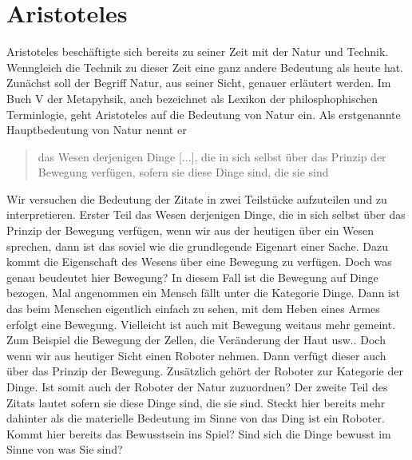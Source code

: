 \section{Aristoteles}
Aristoteles beschäftigte sich bereits zu seiner Zeit mit der Natur und Technik. Wenngleich die Technik zu dieser Zeit eine ganz andere Bedeutung als heute hat. Zunächst soll der Begriff Natur, aus seiner Sicht, genauer erläutert werden. Im Buch V der Metapyhsik, auch bezeichnet als \glqq Lexikon der philosphophischen Terminlogie\grqq{}, geht Aristoteles auf die Bedeutung von Natur ein. Als erstgenannte Hauptbedeutung von Natur nennt er
\begin{quote}
	\glqq das Wesen derjenigen Dinge [...], die in sich selbst über das Prinzip der Bewegung verfügen, sofern sie diese Dinge sind, die sie sind\grqq{}
	\cite[1015a14 f.]{MetaphysikV} 
\end{quote}


Wir versuchen die Bedeutung der Zitate in zwei Teilstücke aufzuteilen und zu interpretieren. Erster Teil \glqq das Wesen derjenigen Dinge, die in sich selbst über das Prinzip der Bewegung verfügen\grqq{}, wenn wir aus der heutigen über ein Wesen sprechen, dann ist das soviel wie die grundlegende Eigenart einer Sache. Dazu kommt die Eigenschaft des Wesens über eine Bewegung zu verfügen. Doch was genau beudeutet hier Bewegung? In diesem Fall ist die Bewegung auf Dinge bezogen. Mal angenommen ein Mensch fällt unter die Kategorie Dinge. Dann ist das beim Menschen eigentlich einfach zu sehen, mit dem Heben eines Armes erfolgt eine Bewegung. Vielleicht ist auch mit Bewegung weitaus mehr gemeint. Zum Beispiel die Bewegung der Zellen, die Veränderung der Haut usw.. Doch wenn wir aus heutiger Sicht einen Roboter nehmen. Dann verfügt dieser auch über das Prinzip der Bewegung. Zusätzlich gehört der Roboter zur Kategorie der Dinge. Ist somit auch der Roboter der Natur zuzuordnen? Der zweite Teil des Zitats lautet \glqq sofern sie diese Dinge sind, die sie sind\grqq{}. Steckt hier bereits mehr dahinter als die materielle Bedeutung im Sinne von \glqq das Ding ist ein Roboter\grqq. Kommt hier bereits das Bewusstsein ins Spiel? Sind sich die Dinge bewusst im Sinne von was Sie sind?  

